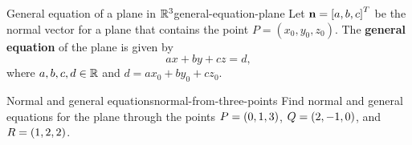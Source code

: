 \begin{definition}{General equation of a plane in $\mathbb{R}^3$}{general-equation-plane}
  Let $\mbox{\bf n} = \left[a,b,c\right]^T$ be the normal vector for a plane that
  contains the point $P = (x_0, y_0, z_0)$. The \textbf{general
    equation}%
   of the plane is given by
  \begin{equation*}
    ax + by + cz = d,
  \end{equation*}
  where $a,b,c,d \in \mathbb{R}$ and $d = ax_0 + by_0 + cz_0$.
\end{definition}

\begin{example}{Normal and general equations}{normal-from-three-points}
  Find normal and general equations for the plane through the points
  $P = \left(0,1,3\right)$, $Q=\left(2,-1,0\right)$, and $R=\left(1,2,2\right)$.
\end{example}


